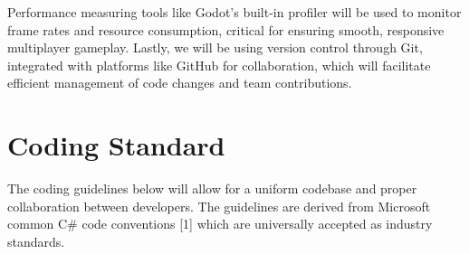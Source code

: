 \documentclass{article}
\begin{document}
Performance measuring tools like Godot's built-in profiler will be used to monitor frame rates and resource consumption, critical for ensuring smooth, responsive multiplayer gameplay. Lastly, we will be using version control through Git, integrated with platforms like GitHub for collaboration, which will facilitate efficient management of code changes and team contributions. \\


\section{Coding Standard}


The coding guidelines below will allow for a uniform codebase and proper collaboration between developers. The guidelines are derived from Microsoft common C\# code conventions [1] which are universally accepted as industry standards.
\end{document}
